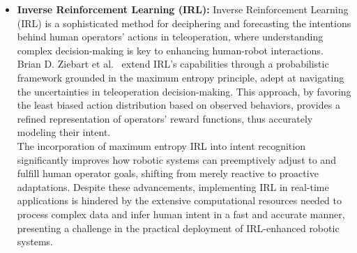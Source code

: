 \begin{itemize}
    \item\textbf{Inverse Reinforcement Learning (IRL):} Inverse Reinforcement Learning (IRL) is a sophisticated method for deciphering and forecasting the intentions behind human operators' actions in teleoperation, where understanding complex decision-making is key to enhancing human-robot interactions.\\
    Brian D. Ziebart et al.~\cite{ziebart2008maximum} extend IRL's capabilities through a probabilistic framework grounded in the maximum entropy principle, adept at navigating the uncertainties in teleoperation decision-making. 
    This approach, by favoring the least biased action distribution based on observed behaviors, provides a refined representation of operators' reward functions, thus accurately modeling their intent.\\
    The incorporation of maximum entropy IRL into intent recognition significantly improves how robotic systems can preemptively adjust to and fulfill human operator goals, shifting from merely reactive to proactive adaptations.
    Despite these advancements, implementing IRL in real-time applications is hindered by the extensive computational resources needed to process complex data and infer human intent in a fast and accurate manner, presenting a challenge in the practical deployment of IRL-enhanced robotic systems.
    

\end{itemize}
